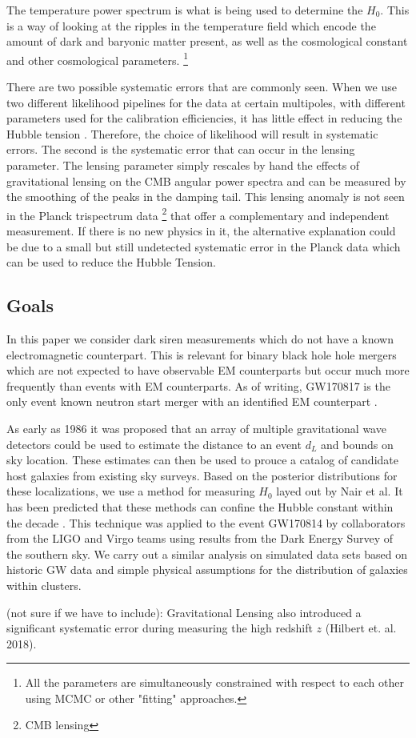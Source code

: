 The temperature power spectrum is what is being used to determine the $H_0$. This is a way of looking at the ripples in the temperature field which encode the amount of dark and baryonic matter present, as well as the cosmological constant and other cosmological parameters.
\footnote{All the parameters are simultaneously constrained with respect to each other using MCMC or other "fitting" approaches. }

There are two possible systematic errors that are commonly seen. When we use two different likelihood pipelines for the data at certain multipoles, with different parameters used for the calibration efficiencies, it has little effect in reducing the Hubble tension \cite{Efstathiou_2021}. Therefore, the choice of likelihood will result in systematic errors. 
The second is the systematic error that can occur in the lensing parameter\cite{Calabrese_2008}. The lensing parameter simply rescales by hand the effects of gravitational lensing on the CMB angular power spectra and can be measured by the smoothing of the peaks in the damping tail. This lensing anomaly is not seen in the
Planck trispectrum data \footnote{CMB lensing} that offer a complementary and independent measurement. If there is no new physics in it, the alternative explanation could be due to a small but still undetected systematic error in the Planck data which can be used to reduce the Hubble Tension.

\subsection{\label{Goals} Goals}
In this paper we consider dark siren measurements which do not have a known electromagnetic counterpart. This is relevant for binary black hole hole mergers which are not expected to have observable EM counterparts but occur much more frequently than events with EM counterparts. As of writing, GW170817 is the only event known neutron start merger with an identified EM counterpart \cite{GW170817_announce}.

As early as 1986 it was proposed that an array of multiple gravitational wave detectors could be used to estimate the distance to an event $d_L$ and bounds on sky location\cite{Schutz_1986}. These estimates can then be used to prouce a catalog of candidate host galaxies from existing sky surveys. Based on the posterior distributions for these localizations, we use a method for measuring $H_0$ layed out by Nair et al\cite{Nair_2018}. It has been predicted that these methods can confine the Hubble constant within the decade \cite{Chen_2018}. This technique was applied to the event GW170814 by collaborators from the LIGO and Virgo teams using results from the Dark Energy Survey of the southern sky\cite{GW170814_DES}. We carry out a similar analysis on simulated data sets based on historic GW data and simple physical assumptions for the distribution of galaxies within clusters.



(not sure if we have to include):
Gravitational Lensing also introduced a significant systematic error during measuring the high redshift $z$ (Hilbert et. al. 2018). 
